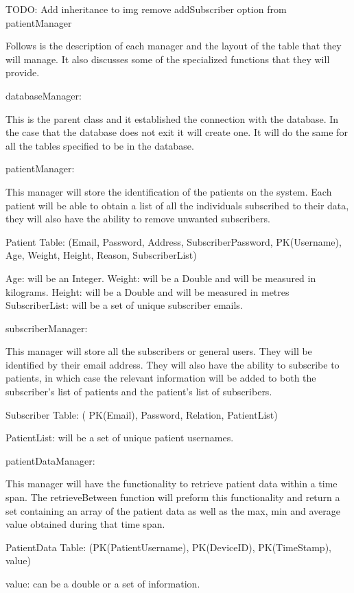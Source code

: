TODO: 
Add inheritance to img
remove addSubscriber option from patientManager


Follows is the description of each manager and the layout of the table that they will manage. It also discusses some of the specialized functions that they will provide.

databaseManager:

	This is the parent class and it established the connection with the database. In the case that the database does 		not exit it will create one. It will do the same for all the tables specified to be in the database.

patientManager:

	This manager will store the identification of the patients on the system. Each patient will be able to obtain a list of all the individuals subscribed to their data, they will also have the ability to remove unwanted subscribers.

	Patient Table:
		(Email, Password, Address, SubscriberPassword, PK(Username), Age, Weight, Height, Reason, SubscriberList) 

	Age: will be an Integer.
	Weight: will be a Double and will be measured in kilograms.
	Height: will be a Double and will be measured in metres
	SubscriberList: will be a set of unique subscriber emails.	
	
	
subscriberManager:

This manager will store all the subscribers or general users. They will be identified by their email address. They will also have the ability to subscribe to patients, in which case the relevant information will be added to both the subscriber's list of patients and the patient's list of subscribers.

	Subscriber Table:
		( PK(Email), Password, Relation, PatientList)
		
		PatientList: will be a set of unique patient usernames.	

patientDataManager:

This manager will have the functionality to retrieve patient data within a time span. The retrieveBetween function will preform this functionality and return a set containing an array of the patient data as well as the max, min and average value obtained during that time span.

	PatientData Table:
		(PK(PatientUsername), PK(DeviceID), PK(TimeStamp), value)
		
		value: can be a double or a set of information.
		
		
		
		
		